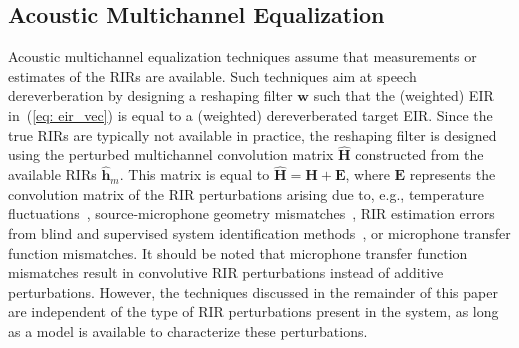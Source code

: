 \documentclass[fleqn]{aes2e}
\begin{document}


\subsection{Acoustic Multichannel Equalization}
\label{sec: ac_tech}
Acoustic multichannel equalization techniques assume that measurements or estimates of the RIRs are available. 
Such techniques aim at speech dereverberation by designing a reshaping filter $\mathbf{w}$ such that the (weighted) EIR in~(\ref{eq: eir_vec}) is equal to a (weighted) dereverberated target EIR.
Since the true RIRs are typically not available in practice, the reshaping filter is designed using the perturbed multichannel convolution matrix $\hat{\mathbf{H}}$ constructed from the available RIRs $\hat{\mathbf{h}}_m$.
This matrix is equal to $\hat{\mathbf{H}} = \mathbf{H} + \mathbf{E}$, where $\mathbf{E}$ represents the convolution matrix of the RIR perturbations arising due to, e.g., temperature fluctuations~\cite{Elko03roomimpulse}, source-microphone geometry mismatches~\cite{cole1997position,Radlovic_ITSA_2000}, RIR estimation errors from blind and supervised system identification methods~\cite{Haque_SPL_2008,Lin_ITASLP_2012}, or microphone transfer function mismatches.
It should be noted that microphone transfer function mismatches result in convolutive RIR perturbations instead of additive perturbations. However, the techniques discussed in the remainder of this paper are independent of the type of RIR perturbations present in the system, as long as a model is available to characterize these perturbations. 
\end{document}
